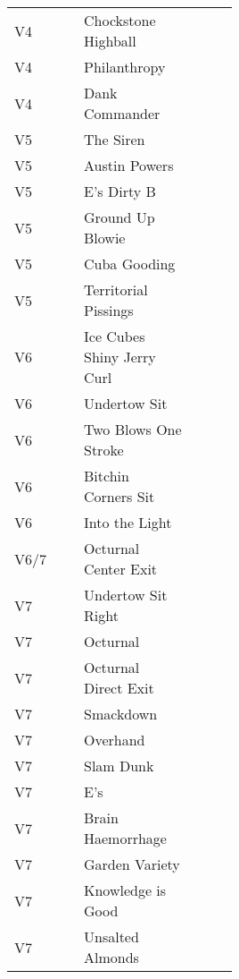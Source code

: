 \begin{center}
\begin{supertabular}{lp{0.5\linewidth}ll}
V4&Chockstone Highball && \pageref{rt:Chockstone Highball} \\
V4&Philanthropy && \pageref{rt:Philanthropy} \\
V4&Dank Commander && \pageref{rt:Dank Commander} \\
V5&The Siren &   & \pageref{rt:The Siren} \\
V5&Austin Powers &  & \pageref{rt:Austin Powers} \\
V5&E's Dirty B &  & \pageref{rt:E's Dirty B} \\
V5&Ground Up Blowie &  & \pageref{rt:Ground Up Blowie} \\
V5&Cuba Gooding && \pageref{rt:Cuba Gooding} \\
V5&Territorial Pissings && \pageref{rt:Territorial Pissings} \\
V6&Ice Cubes Shiny Jerry Curl && \pageref{rt:Ice Cubes Shiny Jerry Curl} \\
V6&Undertow Sit && \pageref{vr:Undertow Sit} \\
V6&Two Blows One Stroke && \pageref{rt:Two Blows One Stroke} \\
V6&Bitchin Corners Sit && \pageref{vr:Bitchin Corners Sit} \\
V6&Into the Light && \pageref{rt:Into the Light} \\
V6/7&Octurnal Center Exit &  & \pageref{vr:Octurnal Center Exit} \\
V7&Undertow Sit Right &   & \pageref{vr:Undertow Sit Right} \\
V7&Octurnal &   & \pageref{rt:Octurnal} \\
V7&Octurnal Direct Exit &   & \pageref{vr:Octurnal Direct Exit} \\
V7&Smackdown &  & \pageref{rt:Smackdown} \\
V7&Overhand && \pageref{rt:Overhand} \\
V7&Slam Dunk && \pageref{rt:Slam Dunk} \\
V7&E's && \pageref{rt:E's} \\
V7&Brain Haemorrhage && \pageref{vr:Brain Haemorrhage} \\
V7&Garden Variety && \pageref{rt:Garden Variety} \\
V7&Knowledge is Good && \pageref{rt:Knowledge is Good} \\
V7&Unsalted Almonds && \pageref{rt:Unsalted Almonds} \\

\end{supertabular}
\end{center}
